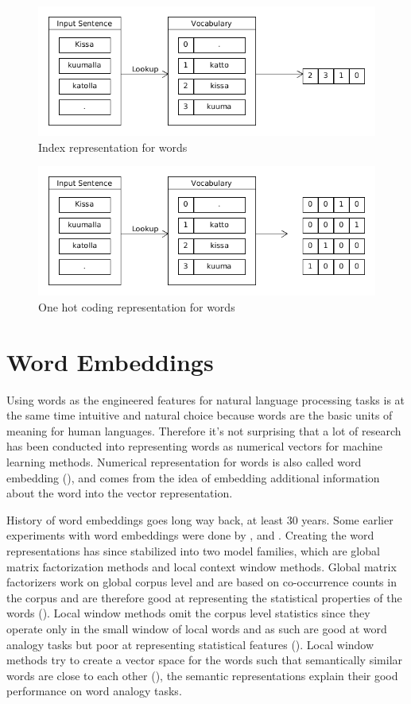 \documentclass[12pt,a4paper,english
]{tutthesis}
\begin{document}
\begin{figure}[htbp]
\caption{Index representation for words}
\label{figure:index_representation}
\centering
\includegraphics[width=12cm]{index_representation.png}
\end{figure}

\begin{figure}[htbp]
\caption{One hot coding representation for words}
\label{figure:one_hot}
\centering
\includegraphics[width=12cm]{one_hot.png}
\end{figure}

\section{Word Embeddings}
\label{se:word_embeddings}
Using words as the engineered features for natural language processing tasks is at the same time intuitive and natural choice because words are the basic units of meaning for human languages. Therefore it's not surprising that a lot of research has been conducted into representing words as numerical vectors for machine learning methods. Numerical representation for words is also called word embedding (\cite{Mikolov2013a}), and comes from the idea of embedding additional information about the word into the vector representation.

History of word embeddings goes long way back, at least 30 years. Some earlier experiments with word embeddings were done by \cite{Hinton1990}, \cite{Hinton1985} and \cite{Elman1990}. Creating the word representations has since stabilized into two model families, which are global matrix factorization methods and local context window methods. Global matrix factorizers work on global corpus level and are based on co-occurrence counts in the corpus and are therefore good at representing the statistical properties of the words (\cite{Pennington2014}). Local window methods omit the corpus level statistics since they operate only in the small window of local words and as such are good at word analogy tasks but poor at representing statistical features (\cite{Pennington2014}). Local window methods try to create a vector space for the words such that semantically similar words are close to each other (\cite{Mikolov2013a}), the semantic representations explain their good performance on word analogy tasks.
\end{document}
